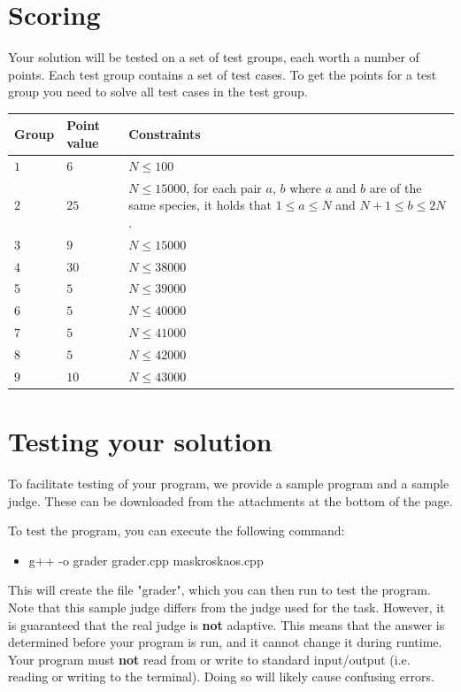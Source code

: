 \section*{Scoring}
Your solution will be tested on a set of test groups, each worth a number of points. 
Each test group contains a set of test cases. 
To get the points for a test group you need to solve all test cases in the test group.

\noindent
\begin{tabular}{| l | l | p{12cm} |}
  \hline
  \textbf{Group} & \textbf{Point value} & \textbf{Constraints} \\ \hline
  $1$    & $6$         & $N \leq 100$  \\ \hline
  $2$    & $25$        & $N \leq 15000$, for each pair $a$, $b$ where $a$ and $b$ are of the same species, it holds that
  $1 \leq a \leq N$ and $N+1 \leq b \leq 2N$. \\ \hline
  $3$    & $9$         & $N \leq 15000$ \\ \hline
  $4$    & $30$        & $N \leq 38000$ \\ \hline
  $5$    & $5$         & $N \leq 39000$ \\ \hline
  $6$    & $5$         & $N \leq 40000$ \\ \hline
  $7$    & $5$         & $N \leq 41000$ \\ \hline
  $8$    & $5$         & $N \leq 42000$ \\ \hline
  $9$    & $10$        & $N \leq 43000$ \\ \hline

\end{tabular}


\section*{Testing your solution}
To facilitate testing of your program, we provide a sample program and a sample judge. These can be downloaded from
the attachments at the bottom of the page.

To test the program, you can execute the following command:
\begin{itemize}
  \item g++ -o grader grader.cpp maskroskaos.cpp
\end{itemize}

This will create the file "grader", which you can then run to test the program. Note that this sample judge differs
from the judge used for the task. However, it is guaranteed that the real judge is \textbf{not} adaptive. This means
that the answer is determined before your program is run, and it cannot change it during runtime. Your program must
\textbf{not} read from or write to standard input/output (i.e. reading or writing to the terminal). Doing so
will likely cause confusing errors.


